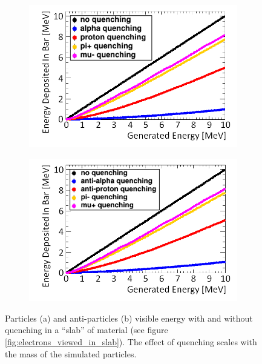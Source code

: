 \begin{figure}[!h]
\centering
\begin{subfigure}{.45\textwidth}
  \centering
  \includegraphics[width=\linewidth]{Chapter4/Figs/particleQuenchingeExample_adjustedMedText.png}
  \captionsetup{width=.9\linewidth}
  \caption{}
  \label{subFig:proton_quenched_and_not}
\end{subfigure}%
\begin{subfigure}{.45\textwidth}
  \centering
  \includegraphics[width=\linewidth]{Chapter4/Figs/antiParticleQuenchingeExample_adjustedMedText.png}
  \captionsetup{width=.9\linewidth}
  \caption{}
  \label{subFig:Aproton_quenched_and_not}
\end{subfigure}
\caption{Particles (a) and anti-particles (b) visible energy with and without quenching in a ``slab'' of material (see figure \ref{fig:electrons_viewed_in_slab}). The effect of quenching scales with the mass of the simulated particles.}
\label{fig:proton_Apronton_quenched_and_not}
\end{figure}

